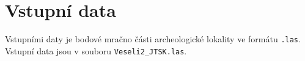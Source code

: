 \section{Vstupní data}
Vstupními daty je bodové mračno části archeologické lokality ve formátu \texttt{.las}. Vstupní data jsou v souboru \texttt{Veseli2\_JTSK.las}.
